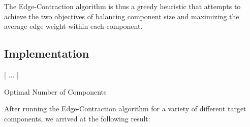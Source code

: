 The Edge-Contraction algorithm is thus a greedy heuristic that attempts to achieve the two objectives of balancing component size and maximizing the average edge weight within each component.

\subsection{Implementation}

[ ... ]

Optimal Number of Components

After running the Edge-Contraction algorithm for a variety of different target components, we arrived at the following result:

